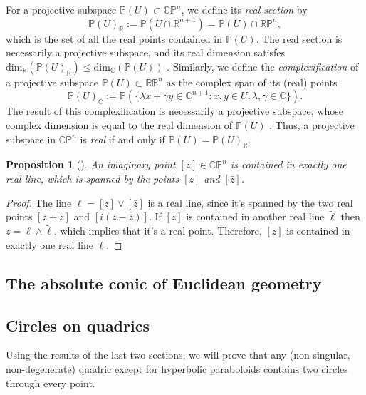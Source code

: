\documentclass[12pt,a4paper]{article}
\theoremstyle{BoldTopSpacing}
\theoremstyle{BoldTopSpacing}
\theoremstyle{BoldTopSpacing}
\theoremstyle{BoldTopBottomSpacing}
\theoremstyle{BoldTopSpacing}
\newtheorem{proposition}{Proposition}[section]
\theoremstyle{BoldTopBottomSpacing}
\theoremstyle{remark}
\begin{document}
For a projective subspace $\mathbb{P}(U) \subset \mathbb{C}\mathbb{P}^n$, we define its \textit{real section} by
\[
    \mathbb{P}(U)_{\mathbb{R}} := \mathbb{P}(U \cap \mathbb{R}^{n+1}) = \mathbb{P}(U) \cap \mathbb{R}\mathbb{P}^n,
\]
which is the set of all the real points contained in $\mathbb{P}(U)$. The real section is necessarily a projective subspace, and its real dimension satisfes  $\text{dim}_{\mathbb{R}}\left(\mathbb{P}(U)_{\mathbb{R}}\right) \leq \text{dim}_{\mathbb{C}}\left(\mathbb{P}(U)\right)$ \cite{geometryII}.
Similarly, we define the \textit{complexification} of a projective subspace $\mathbb{P}(U) \subset \mathbb{R}\mathbb{P}^n$ as the complex span of its (real) points
\[
    \mathbb{P}(U)_{\mathbb{C}} := \mathbb{P}(\{ \lambda x + \gamma y \in \mathbb{C}^{n+1} : x, y \in U, \lambda, \gamma \in \mathbb{C} \}).
\]
The result of this complexification is necessarily a projective subspace, whose complex dimension is equal to the real dimension of $\mathbb{P}(U)$ \cite{geometryII}. Thus, a projective subspace in $\mathbb{C}\mathbb{P}^n$ is \textit{real} if and only if $\mathbb{P}(U) = \mathbb{P}(U)_{\mathbb{R}}$. \par

\begin{proposition}[]
\label{thm:span-real-line}
An imaginary point $[z] \in \mathbb{C}\mathbb{P}^n$ is contained in exactly one real line, which is spanned by the points $[z]$ and $[\bar{z}]$.
\end{proposition}

\begin{proof}
The line $\ell = [z] \vee [\bar{z}]$ is a real line, since it's spanned by the two real points $[z + \bar{z}]$ and $[i(z - \bar{z})]$. If $[z]$ is contained in another real line $\tilde{\ell}$ then $z = \ell \wedge \tilde{\ell}$, which implies that it's a real point. Therefore, $[z]$ is contained in exactly one real line $\ell$.
\end{proof}

\subsection{The absolute conic of Euclidean geometry}
\label{subsec:absolute-quadrics}

\subsection{Circles on quadrics}
\label{subsec:circles-on-quadrics}

Using the results of the last two sections, we will prove that any (non-singular, non-degenerate) quadric except for hyperbolic paraboloids contains two circles through every point.
\end{document}
